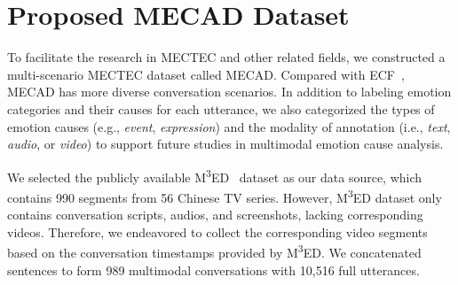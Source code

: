 \documentclass[11pt]{article}
\begin{document}
\section{Proposed MECAD Dataset}
To facilitate the research in MECTEC and other related fields, we constructed a multi-scenario MECTEC dataset called MECAD.
Compared with ECF~\cite{ecf}, MECAD has more diverse conversation scenarios.
In addition to labeling emotion categories and their causes for each utterance, we also categorized the types of emotion causes (e.g., \textit{event}, \textit{expression}) and the modality of annotation (i.e., \textit{text}, \textit{audio}, or \textit{video}) to support future studies in multimodal emotion cause analysis.

We selected the publicly available M\textsuperscript{3}ED~\cite{M3ED} dataset as our data source, which contains 990 segments from 56 Chinese TV series.
However, M\textsuperscript{3}ED dataset only contains conversation scripts, audios, and screenshots, lacking corresponding videos.
Therefore, we endeavored to collect the corresponding video segments based on the conversation timestamps provided by M\textsuperscript{3}ED.
We concatenated sentences to form 989 multimodal conversations with 10,516 full utterances.
\end{document}
